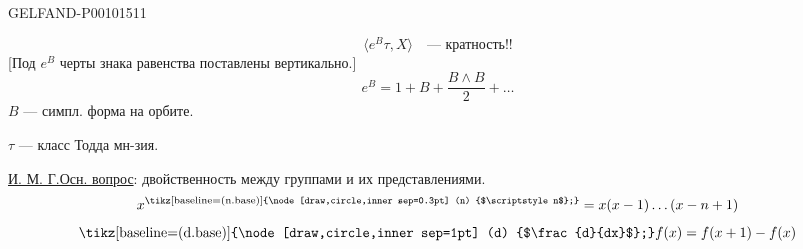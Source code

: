 \begin{GelfandAdjacentEvidence}{GELFAND-P001015}{11}


\[
\langle e^B\tau,X\rangle\quad\text{--- кратность!!}
\]
[Под $e^B$ черты знака равенства поставлены вертикально.]
\[
e^B=1+B+\frac{B\wedge B}{2}+\ldots
\]
$B$ --- симпл. форма на орбите.

$\tau$ --- класс Тодда мн-зия.

\underline{И. М. Г.}\qquad \underline{Осн. вопрос}: двойственность между группами и их представлениями.
\[
x^{\text{\tikz[baseline=(n.base)]{\node[draw,circle,inner sep=0.3pt] (n) {$\scriptstyle n$};}}}
=x(x-1)\ldots(x-n+1)
\]
\[
\text{\tikz[baseline=(d.base)]{\node[draw,circle,inner sep=1pt] (d) {$\frac{d}{dx}$};}}f(x)
=f(x+1)-f(x)
\]
\end{GelfandAdjacentEvidence}



